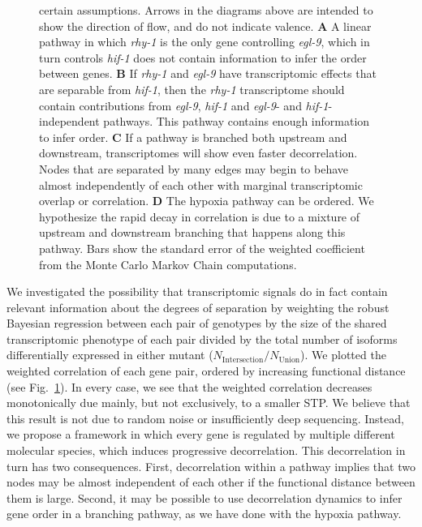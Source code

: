 \documentclass[9pt,twocolumn,twoside]{pnas-new}
\newcommand{\gene}[1]{\emph{#1}}
\begin{document}
\begin{figure}[tbhp]
{certain assumptions. Arrows in the diagrams above are intended to show the
direction of flow, and do not indicate valence.
\textbf{A} A linear pathway in which \gene{rhy-1} is the only gene controlling
\gene{egl-9}, which in turn controls \gene{hif-1} does not contain information
to infer the order between genes.
\textbf{B} If \gene{rhy-1} and \gene{egl-9} have transcriptomic effects that are
separable from \gene{hif-1}, then the \gene{rhy-1} transcriptome should contain
contributions from \gene{egl-9}, \gene{hif-1} and \gene{egl-9}- and
\gene{hif-1}-independent pathways. This pathway contains enough information to
infer order.
\textbf{C} If a pathway is branched both upstream and downstream,
transcriptomes will show even faster decorrelation. Nodes that are
separated by many edges may begin to behave almost independently of each other
with marginal transcriptomic overlap or correlation.
\textbf{D} The hypoxia pathway can be ordered.
We hypothesize the rapid decay in correlation is due to a mixture of
upstream and downstream branching that happens along this pathway. Bars show the
standard error of the weighted coefficient from the Monte Carlo Markov Chain
computations.
}
\label{fig:decorrelation}
\end{figure}

We investigated the possibility that transcriptomic signals do in fact contain
relevant information about the degrees of separation by weighting the robust
Bayesian regression between each pair of genotypes by the size of the shared
transcriptomic phenotype of each pair divided by the total number of isoforms
differentially expressed in either mutant
($N_\mathrm{Intersection}/N_{\mathrm{Union}}$). We plotted the weighted
correlation of each gene pair, ordered by increasing functional distance
(see Fig.~\ref{fig:decorrelation}). In every case, we see that the weighted
correlation decreases monotonically due mainly, but not exclusively, to a smaller
STP.
We believe that this result is not due to random noise or insufficiently deep
sequencing. Instead, we propose a framework in which every gene is regulated
by multiple different molecular species, which induces progressive decorrelation.
This decorrelation in turn has two consequences. First, decorrelation within a
pathway implies that two nodes may be almost independent of each other if the
functional distance between them is large. Second, it may be possible to use
decorrelation dynamics to infer gene order in a branching pathway, as we have
done with the hypoxia pathway.
\end{document}
